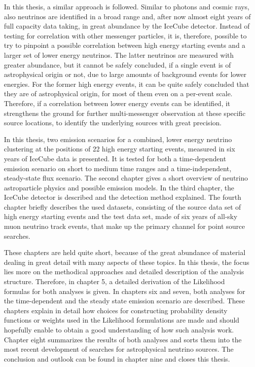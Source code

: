 In this thesis, a similar approach is followed.
Similar to photons and cosmic rays, also neutrinos are identified in a broad range and,  after now almost eight years of full capacity data taking, in great abundance by the IceCube detector.
Instead of testing for correlation with other messenger particles, it is, therefore, possible to try to pinpoint a possible correlation between high energy starting events and a larger set of lower energy neutrinos.
The latter neutrinos are measured with greater abundance, but it cannot be safely concluded, if a single event is of astrophysical origin or not, due to large amounts of background events for lower energies.
For the former high energy events, it can be quite safely concluded that they are of astrophysical origin, for most of them even on a per-event scale.
Therefore, if a correlation between lower energy events can be identified, it strengthens the ground for further multi-messenger observation at these specific source locations, to identify the underlying sources with great precision.

In this thesis, two emission scenarios for a combined, lower energy neutrino clustering at the positions of 22 high energy starting events, measured in six years of IceCube data is presented.
It is tested for both a time-dependent emission scenario on short to medium time ranges and a time-independent, steady-state flux scenario.
The second chapter gives a short overview of neutrino astroparticle physics and possible emission models.
In the third chapter, the IceCube detector is described and the detection method explained.
The fourth chapter briefly describes the used datasets, consisting of the source data set of high energy starting events and the test data set, made of six years of all-sky muon neutrino track events, that make up the primary channel for point source searches.

These chapters are held quite short, because of the great abundance of material dealing in great detail with many aspects of these topics.
In this thesis, the focus lies more on the methodical approaches and detailed description of the analysis structure.
Therefore, in chapter 5, a detailed derivation of the Likelihood formulas for both analyses is given.
In chapters six and seven, both analyses for the time-dependent and the steady state emission scenario are described.
These chapters explain in detail how choices for constructing probability density functions or weights used in the Likelihood formulations are made and should hopefully enable to obtain a good understanding of how such analysis work.
Chapter eight summarizes the results of both analyses and sorts them into the most recent development of searches for astrophysical neutrino sources.
The conclusion and outlook can be found in chapter nine and closes this thesis.
